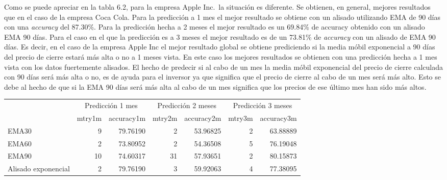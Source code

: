 \documentclass[]{DissertateUSU}
\begin{document}
\setlength\parskip{5ex}

\noindent Como se puede apreciar en la tabla 6.2, para la empresa Apple
Inc.~la situación es diferente. Se obtienen, en general, mejores
resultados que en el caso de la empresa Coca Cola. Para la predicción a
1 mes el mejor resultado se obtiene con un alisado utilizando EMA de 90
días con una \emph{accuracy} del 87.30\%. Para la predicción hecha a 2
meses el mejor resultado es un 69.84\% de accuracy obtenido con un
alisado EMA 90 días. Para el caso en el que la predicción es a 3 meses
el mejor resultado es de un 73.81\% de \emph{accuracy} con un alisado de
EMA 90 días. Es decir, en el caso de la empresa Apple Inc el mejor
resultado global se obtiene prediciendo si la media móbil exponencial a
90 días del precio de cierre estará más alta o no a 1 meses vista. En
este caso los mejores resultados se obtienen con una predicción hecha a
1 mes vista con los datos fuertemente alisados. El hecho de predecir si
al cabo de un mes la media móbil exponencial del precio de cierre
calculada con 90 días será más alta o no, es de ayuda para el inversor
ya que significa que el precio de cierre al cabo de un mes será más
alto. Esto se debe al hecho de que si la EMA 90 días será más alta al
cabo de un mes significa que los precios de ese último mes han sido más
altos.

\begin{table}[H]
\centering\begingroup\fontsize{10}{12}\selectfont

\begin{tabular}{l|r|r|r|r|r|r}
\hline
\multicolumn{1}{c|}{ } & \multicolumn{2}{c|}{Predicción 1 mes} & \multicolumn{2}{c|}{Predicción 2 meses} & \multicolumn{2}{c}{Predicción 3 meses} \\
\cline{2-3} \cline{4-5} \cline{6-7}
  & mtry1m & accuracy1m & mtry2m & accuracy2m & mtry3m & accuracy3m\\
\hline
EMA30 & 9 & 79.76190 & 2 & 53.96825 & 2 & 63.88889\\
\hline
EMA60 & 2 & 73.80952 & 2 & 54.36508 & 5 & 76.19048\\
\hline
EMA90 & 10 & 74.60317 & 31 & 57.93651 & 2 & 80.15873\\
\hline
Alisado exponencial & 2 & 79.76190 & 3 & 59.92063 & 4 & 77.38095\\
\hline
\end{tabular}
\endgroup{}
\end{table}
\end{document}
